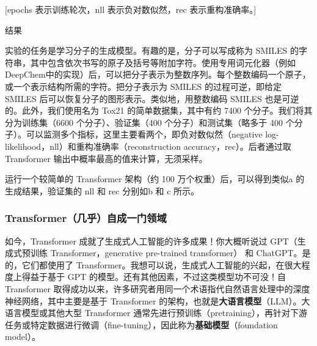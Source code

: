 [epochs 表示训练轮次，nll 表示负对数似然，rec 表示重构准确率。]

\par\medskip\noindent 结果\par\nobreak\smallskip
实验的任务是学习分子的生成模型。有趣的是，分子可以写成称为 SMILES 的字符串，其中包含依次书写的原子及括号等附加字符。使用专用词元化器（例如 DeepChem中的实现）后，可以把分子表示为整数序列。每个整数编码一个原子，或一个表示结构所需的字符。把分子表示为 SMILES 的过程可逆，即给定 SMILES 后可以恢复分子的图形表示。类似地，用整数编码 SMILES 也是可逆的。此外，我们使用名为 Tox21 的简单数据集，其中有约 7400 个分子。我们将其分为训练集（6600 个分子）、验证集（400 个分子）和测试集（略多于 400 个分子）。可以监测多个指标，这里主要看两个，即负对数似然（negative log-likelihood，nll）和重构准确率（reconstruction accuracy，rec）。后者通过取 Transformer 输出中概率最高的值来计算，无须采样。

运行一个较简单的 Transformer 架构（约 100 万个权重）后，可以得到类似a 的生成结果，验证集的 nll 和 rec 分别如b 和 c 所示。

\subsubsection{Transformer（几乎）自成一门领域}

如今，Transformer 成就了生成式人工智能的许多成果！你大概听说过 GPT（生成式预训练 Transformer，generative pre-trained transformer） 和 ChatGPT。是的，它们都使用了 Transformer。我想可以说，生成式人工智能的兴起，在很大程度上得益于基于 GPT 的模型。还有其他因素，不过这类模型功不可没！自 Transformer 取得成功以来，许多研究者用同一个术语指代自然语言处理中的深度神经网络，其中主要是基于 Transformer 的架构，也就是\textbf{大语言模型}（LLM）。大语言模型或其他大型 Transformer 通常先进行预训练（pretraining），再针对下游任务或特定数据进行微调（fine-tuning），因此称为\textbf{基础模型}（foundation model）。

